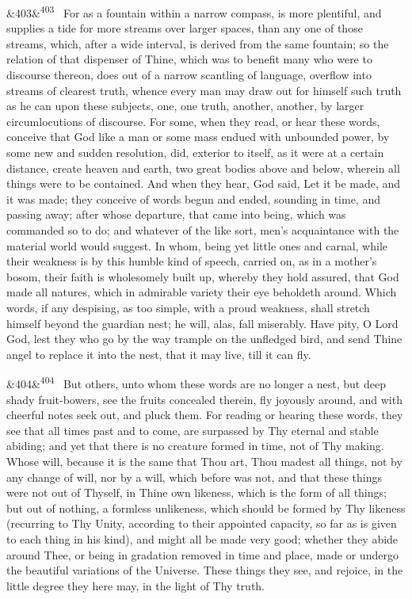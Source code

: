 \documentclass[12pt]{article}
\newcommand{\para}[1][]{\par\noindent\ifx&#1&\else\textsuperscript{\footnotesize #1}~\fi}
\begin{document}
\para[403] For as a fountain within a narrow compass, is more plentiful, and supplies a tide for more streams over larger spaces, than any one of those streams, which, after a wide interval, is derived from the same fountain; so the relation of that dispenser of Thine, which was to benefit many who were to discourse thereon, does out of a narrow scantling of language, overflow into streams of clearest truth, whence every man may draw out for himself such truth as he can upon these subjects, one, one truth, another, another, by larger circumlocutions of discourse. For some, when they read, or hear these words, conceive that God like a man or some mass endued with unbounded power, by some new and sudden resolution, did, exterior to itself, as it were at a certain distance, create heaven and earth, two great bodies above and below, wherein all things were to be contained. And when they hear, God said, Let it be made, and it was made; they conceive of words begun and ended, sounding in time, and passing away; after whose departure, that came into being, which was commanded so to do; and whatever of the like sort, men's acquaintance with the material world would suggest. In whom, being yet little ones and carnal, while their weakness is by this humble kind of speech, carried on, as in a mother's bosom, their faith is wholesomely built up, whereby they hold assured, that God made all natures, which in admirable variety their eye beholdeth around. Which words, if any despising, as too simple, with a proud weakness, shall stretch himself beyond the guardian nest; he will, alas, fall miserably. Have pity, O Lord God, lest they who go by the way trample on the unfledged bird, and send Thine angel to replace it into the nest, that it may live, till it can fly.

\para[404] But others, unto whom these words are no longer a nest, but deep shady fruit-bowers, see the fruits concealed therein, fly joyously around, and with cheerful notes seek out, and pluck them. For reading or hearing these words, they see that all times past and to come, are surpassed by Thy eternal and stable abiding; and yet that there is no creature formed in time, not of Thy making. Whose will, because it is the same that Thou art, Thou madest all things, not by any change of will, nor by a will, which before was not, and that these things were not out of Thyself, in Thine own likeness, which is the form of all things; but out of nothing, a formless unlikeness, which should be formed by Thy likeness (recurring to Thy Unity, according to their appointed capacity, so far as is given to each thing in his kind), and might all be made very good; whether they abide around Thee, or being in gradation removed in time and place, made or undergo the beautiful variations of the Universe. These things they see, and rejoice, in the little degree they here may, in the light of Thy truth.
\end{document}
